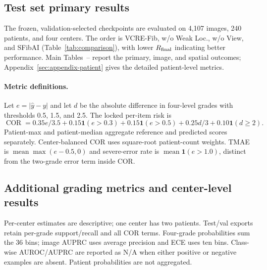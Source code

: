 \subsection{Test set primary results}
The frozen, validation-selected checkpoints are evaluated on 4,107 images, 240 patients, and four centers. The order is VCRE-Fib, w/o Weak Loc., w/o View, and SFibAI (Table~\ref{tab:comparison}), with lower $R_{\mathrm{final}}$ indicating better performance. Main Tables~-- report the primary, image, and spatial outcomes; Appendix~\ref{sec:appendix-patient} gives the detailed patient-level metrics.

\paragraph{Metric definitions.}
Let $e=|\hat y-y|$ and let $d$ be the absolute difference in four-level grades with thresholds 0.5, 1.5, and 2.5. The locked per-item risk is
\[
\operatorname{COR}=0.35e/3.5+0.15\mathbf{1}(e>0.3)+0.15\mathbf{1}(e>0.5)+0.25d/3+0.10\mathbf{1}(d\ge2).
\]
Patient-max and patient-median aggregate reference and predicted scores separately. Center-balanced COR uses square-root patient-count weights. TMAE is $\operatorname{mean}\max(e-0.5,0)$ and severe-error rate is $\operatorname{mean}\mathbf{1}(e>1.0)$, distinct from the two-grade error term inside COR.

\subsection{Additional grading metrics and center-level results}
Per-center estimates are descriptive; one center has two patients. Test/val exports retain per-grade support/recall and all COR terms. Four-grade probabilities sum the 36 bins; image AUPRC uses average precision and ECE uses ten bins. Class-wise AUROC/AUPRC are reported as N/A when either positive or negative examples are absent. Patient probabilities are not aggregated.
\FloatBarrier
